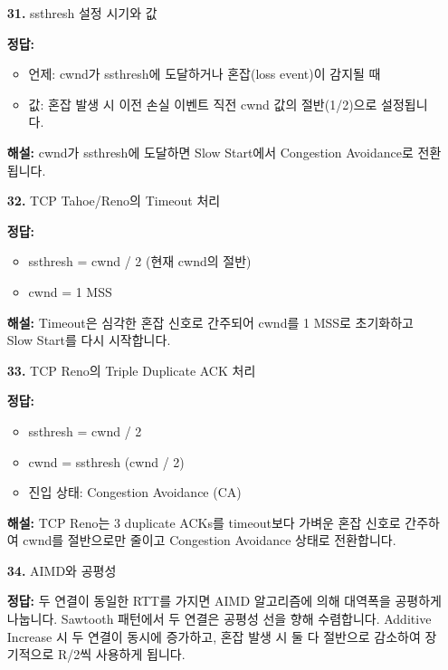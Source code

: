 \documentclass[a4paper, 10pt]{article}
\begin{document}
\begin{enumerate}[itemsep=2.5em, leftmargin=2em, label={}]
\item[\textbf{31.}] ssthresh 설정 시기와 값
\vspace{0.5em}

\noindent\textbf{정답:}
\begin{itemize}[itemsep=0.3em]
    \item 언제: cwnd가 ssthresh에 도달하거나 혼잡(loss event)이 감지될 때
    \item 값: 혼잡 발생 시 이전 손실 이벤트 직전 cwnd 값의 절반(1/2)으로 설정됩니다.
\end{itemize}

\small\textbf{해설:} cwnd가 ssthresh에 도달하면 Slow Start에서 Congestion Avoidance로 전환됩니다.

\item[\textbf{32.}] TCP Tahoe/Reno의 Timeout 처리
\vspace{0.5em}

\noindent\textbf{정답:}
\begin{itemize}[itemsep=0.3em]
    \item ssthresh = cwnd / 2 (현재 cwnd의 절반)
    \item cwnd = 1 MSS
\end{itemize}

\small\textbf{해설:} Timeout은 심각한 혼잡 신호로 간주되어 cwnd를 1 MSS로 초기화하고 Slow Start를 다시 시작합니다.

\item[\textbf{33.}] TCP Reno의 Triple Duplicate ACK 처리
\vspace{0.5em}

\noindent\textbf{정답:}
\begin{itemize}[itemsep=0.3em]
    \item ssthresh = cwnd / 2
    \item cwnd = ssthresh (cwnd / 2)
    \item 진입 상태: Congestion Avoidance (CA)
\end{itemize}

\small\textbf{해설:} TCP Reno는 3 duplicate ACKs를 timeout보다 가벼운 혼잡 신호로 간주하여 cwnd를 절반으로만 줄이고 Congestion Avoidance 상태로 전환합니다.

\item[\textbf{34.}] AIMD와 공평성
\vspace{0.5em}

\noindent\textbf{정답:} 두 연결이 동일한 RTT를 가지면 AIMD 알고리즘에 의해 대역폭을 공평하게 나눕니다. Sawtooth 패턴에서 두 연결은 공평성 선을 향해 수렴합니다. Additive Increase 시 두 연결이 동시에 증가하고, 혼잡 발생 시 둘 다 절반으로 감소하여 장기적으로 R/2씩 사용하게 됩니다.


\end{enumerate}
\end{document}
